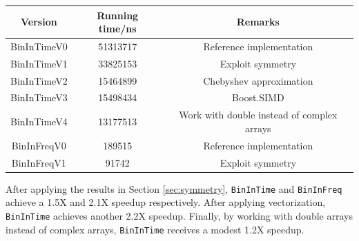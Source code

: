 \documentclass[10pt]{article}
\begin{document}
\begin{center}
\begin{tabular}{|c|c|c|}
\hline
Version & Running time/ns & Remarks \\
\hline
BinInTimeV0 & 51313717 & Reference implementation \\
BinInTimeV1 & 33825153 & Exploit symmetry \\
BinInTimeV2 & 15464899 & Chebyshev approximation \\
BinInTimeV3 & 15498434 & Boost.SIMD \\
BinInTimeV4 & 13177513 & Work with double instead of complex arrays \\
BinInFreqV0 & 189515 & Reference implementation \\
BinInFreqV1 & 91742 & Exploit symmetry\\
\hline
\end{tabular}
\end{center}

After applying the results in Section \ref{sec:symmetry}, \texttt{BinInTime} and \texttt{BinInFreq} achieve a 1.5X and 2.1X speedup respectively. After applying vectorization, \texttt{BinInTime} achieves another 2.2X speedup. Finally, by working with double arrays instead of complex arrays, \texttt{BinInTime} receives a modest 1.2X speedup.



\end{document}
